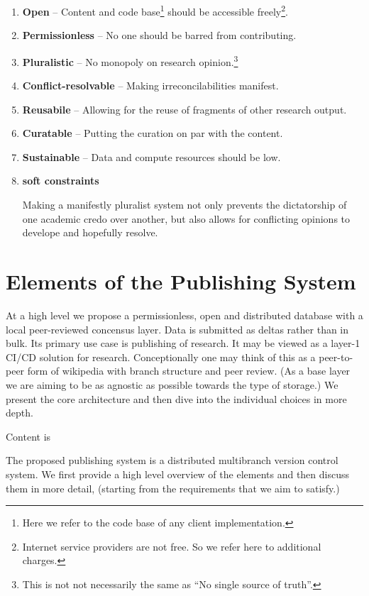 \documentclass[14pt]{article}
\newcommand{\remark}[1]{{\color{purple} (#1)}}
\begin{document}
\begin{enumerate}
 \item \textbf{Open} -- 
 Content and code base\footnote{Here we refer to the code base of any client implementation.} should be accessible freely\footnote{Internet service providers are not free. So we refer here to additional charges.}.
 \item \textbf{Permissionless} --
 No one should be barred from contributing.
 \item \textbf{Pluralistic} -- No monopoly on research opinion.\footnote{This is not not necessarily the same as ``No single source of truth''.}
 \item \textbf{Conflict-resolvable} -- Making irreconcilabilities manifest.
 \item \textbf{Reusabile} -- Allowing for the reuse of fragments of other research output.
 \item \textbf{Curatable} -- Putting the curation on par with the content.
 \item \textbf{Sustainable} -- 
 Data and compute resources should be low.
 \item \textbf{soft constraints}
 
 
 
 Making a manifestly pluralist system not only prevents the dictatorship of one academic credo over another, but also allows for conflicting opinions to develope and hopefully resolve.
 
\end{enumerate}

\section{Elements of the Publishing System}

At a high level we propose a permissionless, open and distributed database with a local peer-reviewed concensus layer. Data is submitted as deltas rather than in bulk. Its primary use case is publishing of research. It may be viewed as a layer-1 CI/CD solution for research. Conceptionally one may think of this as a peer-to-peer form of wikipedia with branch structure and peer review. \remark{As a base layer we are aiming to be as agnostic as possible towards the type of storage.} We present the core architecture and then dive into the individual choices in more depth. 

Content is 



The proposed publishing system is a distributed multibranch version control system. We first provide a high level overview of the elements and then discuss them in more detail, \remark{starting from the requirements that we aim to satisfy.}
\end{document}

